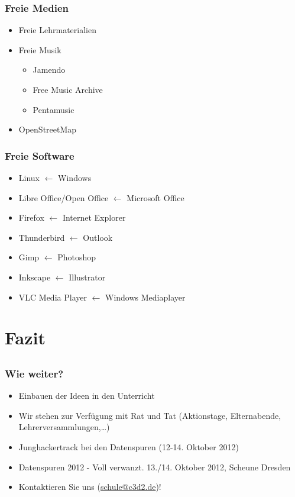 \documentclass{beamer}
\begin{document}
\begin{frame}
  \frametitle{Freie Medien}
  \begin{itemize}
    \item<2-> Freie Lehrmaterialien
    \item<3-> Freie Musik
      \begin{itemize}
        \item Jamendo
        \item Free Music Archive
        \item Pentamusic
      \end{itemize}
    \item<4-> OpenStreetMap
  \end{itemize}
\end{frame}

\begin{frame}
  \frametitle{Freie Software}
  \begin{itemize}
  \item Linux $ \gets $ Windows
    \item Libre Office/Open Office $ \gets $ Microsoft Office
    \item Firefox $ \gets $ Internet Explorer
    \item Thunderbird $ \gets $ Outlook
    \item Gimp $ \gets $ Photoshop
    \item Inkscape $ \gets $ Illustrator
    \item VLC Media Player $ \gets $ Windows Mediaplayer
  \end{itemize}
\end{frame}

\section{Fazit}
\subsection{}

\begin{frame}
  \frametitle{Wie weiter?}
  \begin{itemize}
    \item<2-> Einbauen der Ideen in den Unterricht
    \item<3-> Wir stehen zur Verfügung mit Rat und Tat (Aktionstage, Elternabende, Lehrerversammlungen,\ldots)
    \item<4-> Junghackertrack bei den Datenspuren (12-14. Oktober 2012)
    \item<5-> Datenspuren 2012 - Voll verwanzt. 13./14. Oktober 2012, Scheune Dresden
    \item<6-> Kontaktieren Sie uns (\url{schule@c3d2.de})!
  \end{itemize}
\end{frame}
\end{document}
